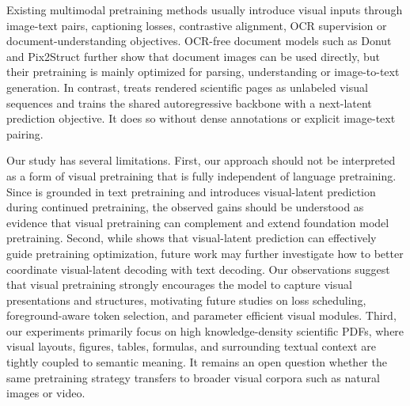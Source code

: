 Existing multimodal pretraining methods usually introduce visual inputs through image-text pairs, captioning losses, contrastive alignment, OCR supervision or document-understanding objectives. OCR-free document models
such as Donut \citep{kim2021donut} and Pix2Struct \citep{lee2023pix2struct} further show that document images can be used directly, but their pretraining is mainly optimized for parsing, understanding or image-to-text generation. 
In contrast, \methodname treats rendered scientific pages as unlabeled visual sequences and trains the shared autoregressive backbone with a next-latent prediction objective. 
It does so without dense annotations or explicit image-text pairing.


Our study has several limitations. 
First, our approach should not be interpreted as a form of visual pretraining that is fully independent of language pretraining. 
Since \methodname is grounded in text pretraining and introduces visual-latent prediction during continued pretraining, the observed gains should be understood as evidence that visual pretraining can complement and extend foundation model pretraining.
Second, while \methodname shows that visual-latent prediction can effectively guide pretraining optimization, 
future work may further investigate how to better coordinate visual-latent decoding with text decoding. 
Our observations suggest that visual pretraining strongly encourages the model to capture visual presentations and structures, 
motivating future studies on loss scheduling, foreground-aware token selection, and parameter efficient visual modules.
Third, our experiments primarily focus on high knowledge-density scientific PDFs, where visual layouts, figures, tables, formulas, and surrounding textual context are tightly coupled to semantic meaning. 
It remains an open question whether the same pretraining strategy transfers to broader visual corpora such as natural images or video.

